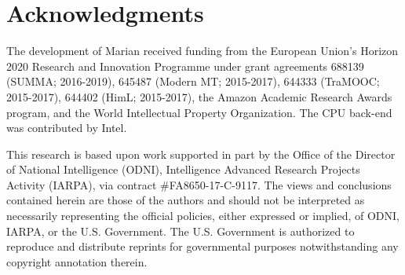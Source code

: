 \documentclass[11pt,a4paper]{article}
\begin{document}
\section*{Acknowledgments}

{\small The development of Marian received funding from the European Union's Horizon 2020 Research and Innovation Programme under grant agreements 688139 (SUMMA; 2016-2019), 645487 (Modern MT; 2015-2017), 644333 (TraMOOC; 2015-2017), 644402 (HimL; 2015-2017), the Amazon Academic Research Awards program, and the World Intellectual Property Organization. The CPU back-end was contributed by Intel. 

 This research is based upon work supported in part by the Office of the Director of National Intelligence (ODNI), Intelligence Advanced Research Projects Activity (IARPA), via contract \#FA8650-17-C-9117. The views and conclusions contained herein are those of the authors and should not be interpreted as necessarily representing the official policies, either expressed or implied, of ODNI, IARPA, or the U.S. Government. The U.S. Government is authorized to reproduce and distribute reprints for governmental purposes notwithstanding any copyright annotation therein.\par}



\end{document}
